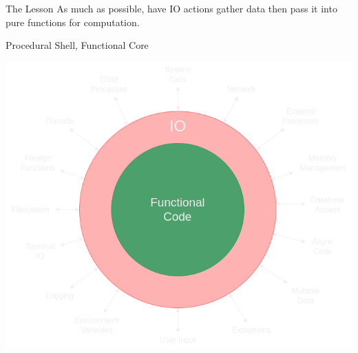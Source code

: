 \documentclass[10pt, presentation, colorlinks]{beamer}
\begin{document}
\begin{frame}[label={sec:orgce9ce9c}]{The Lesson}
As much as possible, have IO actions gather data then pass it into
pure functions for computation.
\end{frame}

\begin{frame}[label={sec:orge556962}]{Procedural Shell, Functional Core}
\begin{center}
\includegraphics[height=0.6\textheight]{./img/functional-core.png}
\end{center}
\end{frame}
\end{document}
